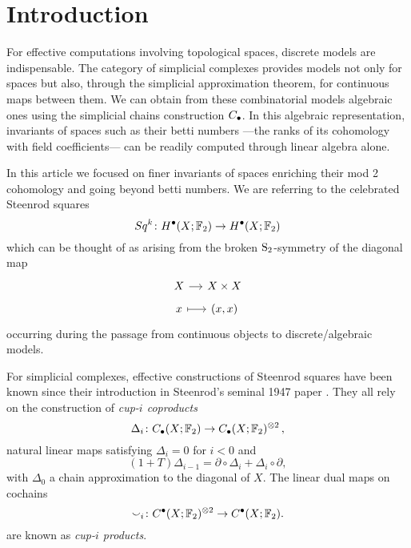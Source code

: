 
\section{Introduction}

For effective computations involving topological spaces, discrete models are indispensable.
The category of simplicial complexes provides models not only for spaces but also, through the simplicial approximation theorem, for continuous maps between them.
We can obtain from these combinatorial models algebraic ones using the simplicial chains construction $\chains$.
In this algebraic representation, invariants of spaces such as their betti numbers ---the ranks of its cohomology with field coefficients--- can be readily computed through linear algebra alone.

In this article we focused on finer invariants of spaces enriching their mod 2 cohomology and going beyond betti numbers.
We are referring to the celebrated Steenrod squares
\begin{equation*}
Sq^k \colon H^\bullet(X; \F_2) \to H^\bullet(X; \F_2)
\end{equation*}
which can be thought of as arising from the broken $\S_2$-symmetry of the diagonal map
\begin{equation*}
\begin{tikzcd}[column sep=small, row sep=tiny]
X \arrow[r] & X \times X \\
x \arrow[r, mapsto] & (x,x)
\end{tikzcd}
\end{equation*}
occurring during the passage from continuous objects to discrete/algebraic models.

For simplicial complexes, effective constructions of Steenrod squares have been known since their introduction in Steenrod's seminal 1947 paper \cite{steenrod47}.
They all rely on the construction of \textit{cup-$i$ coproducts}
\begin{equation*}
\Delta_i \colon \chains(X; \F_2)  \to \chains(X; \F_2)^{\otimes 2}\,,
\end{equation*}
natural linear maps satisfying $\Delta_i = 0$ for $i < 0$ and
\begin{equation} \label{e:boundary of cup-i}
(1 + T) \Delta_{i-1} = \partial \circ \Delta_i + \Delta_i \circ \partial,
\end{equation}
with $\Delta_0$ a chain approximation to the diagonal of $X$.
The linear dual maps on cochains
\begin{equation*}
\smallsmile_i \colon \cochains(X; \F_2)^{\otimes 2} \to \cochains(X; \F_2).
\end{equation*}
are known as \textit{cup-$i$ products}.

